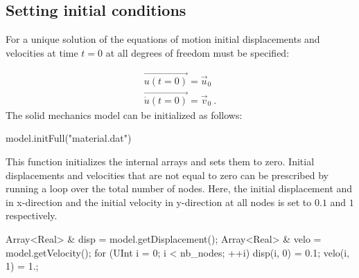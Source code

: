 \subsection{Setting   initial  conditions  \label{sect:smm:initial_condition}}

For  a unique  solution of  the equations  of motion  initial  displacements and
velocities at time $t=0$ at all degrees of freedom must be specified:

\begin{eqnarray}
  \vec{u(t=0)} = \vec{u}_{0}\\
  \vec{\dot u(t=0)} = \vec{v}_{0}~.
\end{eqnarray}
The solid mechanics model can be initialized as follows:
\begin{cpp}
  model.initFull("material.dat")
\end{cpp}
This function  initializes the internal arrays  and sets them  to zero. Initial
displacements and  velocities that are  not equal to  zero can be  prescribed by
running a  loop over the total  number of nodes. Here,  the initial displacement
and in x-direction  and the initial velocity in y-direction at  all nodes is set
to $0.1$ and $1$ respectively.
\begin{cpp}
  Array<Real> & disp = model.getDisplacement();
  Array<Real> & velo = model.getVelocity();
  for (UInt i = 0; i < nb_nodes; ++i) {
    disp(i, 0) = 0.1;
    velo(i, 1) = 1.;
  }
\end{cpp}

